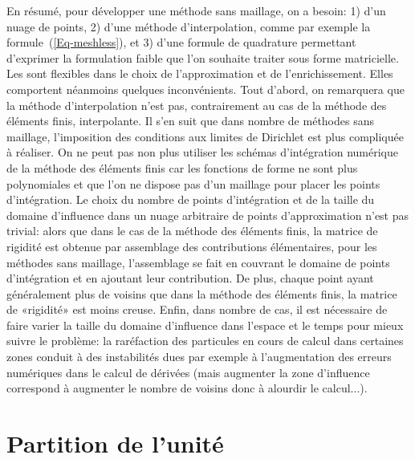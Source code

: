 \medskip
En résumé, pour développer une méthode sans maillage, on a besoin: 1) d'un nuage de points, 2) d'une méthode d'interpolation, comme par exemple la formule~(\ref{Eq-meshless}), et 3) d'une formule de quadrature permettant d'exprimer la formulation faible que l'on souhaite traiter sous forme matricielle.
Les  sont flexibles dans le choix de l'approximation et de l'enrichissement. Elles comportent néanmoins quelques inconvénients.
Tout d'abord, on remarquera que la méthode d'interpolation n'est pas, contrairement au cas de la méthode des éléments finis, interpolante. Il s'en suit que dans nombre de méthodes sans maillage, l'imposition des conditions aux limites de Dirichlet est plus compliquée à réaliser.
On ne peut pas non plus utiliser les schémas d'intégration numérique de la méthode des éléments finis car les fonctions de forme ne sont plus polynomiales et que l'on ne dispose pas d'un maillage pour placer les points d'intégration. Le choix du nombre de points d'intégration et de la taille du domaine d'influence dans un nuage arbitraire de points d'approximation n'est pas trivial: alors que dans le cas de la méthode des éléments finis, la matrice de rigidité est obtenue par assemblage des contributions élémentaires, pour les méthodes sans maillage, l'assemblage se fait en couvrant le domaine de points d'intégration et en ajoutant leur contribution. De plus, chaque point ayant généralement plus de voisins que dans la méthode des éléments finis, la matrice de «rigidité» est moins creuse. Enfin, dans nombre de cas, il est nécessaire de faire varier la taille du domaine d'influence dans l'espace et le temps pour mieux suivre le problème: la raréfaction des particules en cours de calcul dans certaines zones conduit à des instabilités dues par exemple à l'augmentation des erreurs numériques dans le calcul de dérivées (mais augmenter la zone d'influence correspond à augmenter le nombre de voisins donc à alourdir le calcul...).

\medskip
\section{Partition de l'unité}\label{Sec-partition}

